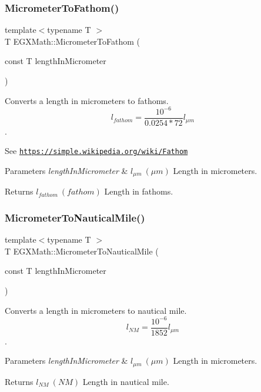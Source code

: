 \subsubsection{\texorpdfstring{Micrometer\+To\+Fathom()}{MicrometerToFathom()}}
{\footnotesize\ttfamily template$<$typename T $>$ \\
T E\+G\+X\+Math\+::\+Micrometer\+To\+Fathom (\begin{DoxyParamCaption}\item[{const T}]{length\+In\+Micrometer }\end{DoxyParamCaption})}



Converts a length in micrometers to fathoms. \[ l_{fathom}= \frac{10^{-6}}{0.0254 * 72} l_{\mu m} \]. 

See \href{https://simple.wikipedia.org/wiki/Fathom}{\tt https\+://simple.\+wikipedia.\+org/wiki/\+Fathom} 
\begin{DoxyParams}{Parameters}
{\em length\+In\+Micrometer} & $ l_{\mu m}\ (\mu m)$ Length in micrometers. \\
\hline
\end{DoxyParams}
\begin{DoxyReturn}{Returns}
$ l_{fathom}\ (fathom)$ Length in fathoms. 
\end{DoxyReturn}
\mbox{\label{group___e_g_x_math-_conversions-_length_conversions-_s_i-_micrometer-_nautical_ga43c5eb76a19baf316e06b38781369157}} 
\subsubsection{\texorpdfstring{Micrometer\+To\+Nautical\+Mile()}{MicrometerToNauticalMile()}}
{\footnotesize\ttfamily template$<$typename T $>$ \\
T E\+G\+X\+Math\+::\+Micrometer\+To\+Nautical\+Mile (\begin{DoxyParamCaption}\item[{const T}]{length\+In\+Micrometer }\end{DoxyParamCaption})}



Converts a length in micrometers to nautical mile. \[ l_{NM}= \frac{10^{-6}}{1852} l_{\mu m} \]. 


\begin{DoxyParams}{Parameters}
{\em length\+In\+Micrometer} & $ l_{\mu m}\ (\mu m)$ Length in micrometers. \\
\hline
\end{DoxyParams}
\begin{DoxyReturn}{Returns}
$ l_{NM}\ (NM)$ Length in nautical mile. 
\end{DoxyReturn}
